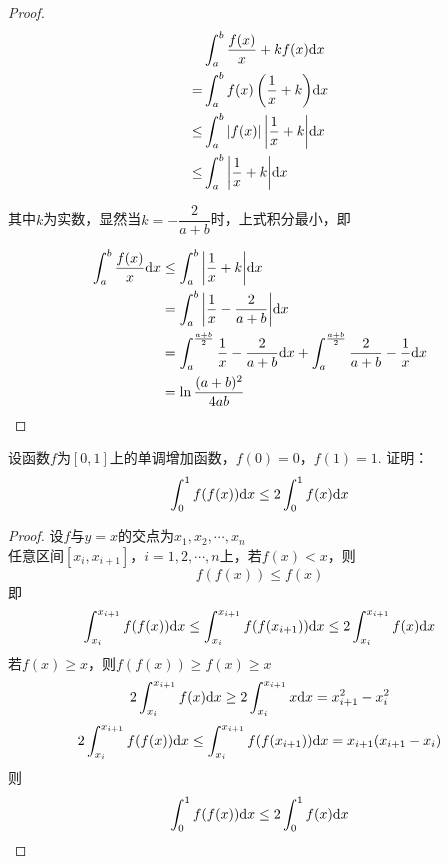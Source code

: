 \begin{proof}

    \begin{align*}
        & \int_{a}^{b}{\dfrac{f(x)}{x} + kf(x)}\mathrm{d} x \\
        = & \int_{a}^{b}{f(x) \left( \dfrac{1}{x} + k \right)}\mathrm{d} x \\
        \leq & \int_{a}^{b}{|f(x)| \left| \dfrac{1}{x} + k \right|}\mathrm{d} x \\
        \leq & \int_{a}^{b}{\left| \dfrac{1}{x} + k \right|}\mathrm{d} x
    \end{align*}

    其中$k$为实数，显然当$k = - \dfrac{2}{a + b}$时，上式积分最小，即

    \begin{align*}
        \int_{a}^{b}{\dfrac{f(x)}{x}}\mathrm{d} x & \leq \int_{a}^{b}{\left| \dfrac{1}{x} + k \right|}\mathrm{d} x \\  
        & = \int_{a}^{b}{\left| \dfrac{1}{x} - \dfrac{2}{a + b} \right|}\mathrm{d} x \\
        & = \int_{a}^{\frac{a + b}{2}}{\dfrac{1}{x} - \dfrac{2}{a + b}}\mathrm{d} x + \int_{a}^{\frac{a + b}{2}}{\dfrac{2}{a + b} - \dfrac{1}{x}}\mathrm{d} x \\
        & = \ln{\dfrac{(a + b)^2}{4ab}}
    \end{align*}

\end{proof}

\begin{proposition}

    设函数$f$为$[0, 1]$上的单调增加函数，$f(0) = 0$，$f(1) = 1$. 证明：
    \[\int_{0}^{1}{f(f(x))}\mathrm{d} x \leq 2\int_{0}^{1}{f(x)}\mathrm{d} x\]

\end{proposition}

\begin{proof}

    设$f$与$y = x$的交点为$x_1, x_2, \cdots , x_n$ \\
    任意区间$[x_i, x_{i + 1}]$，$i = 1, 2, \cdots, n$上，若$f(x) < x$，则
    \[f(f(x)) \leq f(x)\]
    即
    \[\int_{x_i}^{x_{i + 1}}{f(f(x))}\mathrm{d} x \leq \int_{x_i}^{x_{i + 1}}{f(f(x_{i + 1}))}\mathrm{d} x \leq 2\int_{x_i}^{x_{i + 1}}{f(x)}\mathrm{d} x\]
    若$f(x) \geq x$，则$f(f(x)) \geq f(x) \geq x$
    \[2\int_{x_i}^{x_{i + 1}}{f(x)}\mathrm{d} x \geq 2\int_{x_i}^{x_{i + 1}}{x}\mathrm{d} x = x_{i + 1}^2 - x_i^2\]
    \[2\int_{x_i}^{x_{i + 1}}{f(f(x))}\mathrm{d} x \leq \int_{x_i}^{x_{i + 1}}{f(f(x_{i + 1}))}\mathrm{d} x = x_{i + 1}(x_{i + 1} - x_i)\]
    则
    \[\int_{0}^{1}{f(f(x))}\mathrm{d} x \leq 2\int_{0}^{1}{f(x)}\mathrm{d} x\]

\end{proof}

